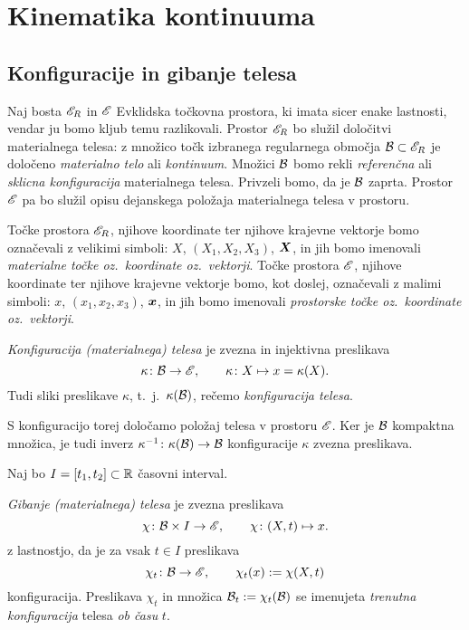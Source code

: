 \chapter{Kinematika kontinuuma} \label{chp:kinkon}


\section{Konfiguracije in gibanje telesa}


Naj bosta $\mathscr E_R$ in $\mathscr E$ Evklidska točkovna prostora, ki imata sicer enake lastnosti,
vendar ju bomo kljub temu razlikovali. Prostor $\mathscr E_R$ bo služil določitvi materialnega
telesa: z množico točk izbranega regularnega območja $\mathcal B\subset\mathscr E_R$ je določeno \emph{materialno
telo} ali \emph{kontinuum}. Množici $\mathcal B$ bomo rekli \emph{referenčna} ali \emph{sklicna konfiguracija}
materialnega telesa. Privzeli bomo, da je $\mathcal B$ zaprta.
Prostor $\mathscr E$ pa bo služil opisu dejanskega položaja materialnega telesa v prostoru.

Točke prostora $\mathscr E_R$, njihove koordinate ter njihove krajevne vektorje bomo označevali
z velikimi simboli: $X$, $(X_1,X_2,X_3)$, $\boldsymbol X$, in jih bomo imenovali
\emph{materialne točke oz.~koordinate oz.~vektorji}.
Točke prostora $\mathscr E$, njihove koordinate ter njihove krajevne vektorje bomo,
kot doslej, označevali z malimi simboli: $x$, $(x_1,x_2,x_3)$, $\boldsymbol x$, in jih bomo imenovali
\emph{prostorske točke oz.~koordinate oz.~vektorji}.

\begin{definicija}
	\emph{Konfiguracija (materialnega) telesa} je zvezna in injektivna preslikava
	\[ \kappa\colon \mathcal B\to\mathscr E,\qquad \kappa\colon X\mapsto x=\kappa(X). \]
	Tudi sliki preslikave $\kappa$, t.~j.~$\kappa(\mathcal B)$, rečemo \emph{konfiguracija telesa}.
\end{definicija}
S konfiguracijo torej določamo položaj telesa v prostoru $\mathscr E$. Ker je $\mathcal B$ kompaktna
množica, je tudi inverz $\kappa^{-1}\colon\kappa(\mathcal B)\to\mathcal B$ konfiguracije $\kappa$ zvezna preslikava.

Naj bo $I=[t_1,t_2]\subset\mathbb R$ časovni interval.
\begin{definicija}
	\emph{Gibanje (materialnega) telesa} je zvezna preslikava
	\begin{equation}\label{e:chi}
		\chi\colon\mathcal B\times I\to\mathscr E,\qquad \chi\colon(X,t)\mapsto x.
	\end{equation}
	z lastnostjo, da je za vsak $t\in I$ preslikava
	\[ \chi_t\colon\mathcal B\to\mathscr E,\qquad \chi_t(x):=\chi(X,t) \]
	konfiguracija. Preslikava $\chi_t$ in množica $\mathcal B_t:=\chi_t(\mathcal B)$ se imenujeta
	\emph{trenutna konfiguracija} telesa \emph{ob času} $t$.
\end{definicija}

